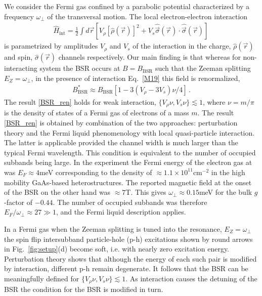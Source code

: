 We consider the Fermi gas confined by a parabolic potential characterized by a frequency $\omega_{\perp}$ of the transversal motion. 
The local electron-electron interaction 
\begin{align}\label{M19}
\hat{H}_{\mathrm{int}} = \frac{1}{2} \int d \vec{r} \left[ V_{\rho} \left[\hat{\rho}(\vec{r})\right]^2 + 
V_s \hat{\vec{\sigma}}(\vec{r}) \cdot  \hat{\vec{\sigma}}(\vec{r}) \right]\,
\end{align}
is parametrized by amplitudes $V_{\rho}$ and $V_s$ of the interaction in the charge, $\hat{\rho}(\vec{r})$ and spin, $\hat{\sigma}(\vec{r})$ channels respectively.
Our main finding is that whereas for non-interacting system the BSR occurs at $B=B_{\mathrm{BSR}}$ such that the Zeeman splitting $E_Z = \omega_{\perp}$, in the presence of interaction Eq.~\eqref{M19} this field is renormalized,
\begin{align}\label{BSR_ren}
B^*_{\mathrm{BSR}} \approx B_{\mathrm{BSR}} \left[ 1 - 3 (V_{\rho} - 3 V_s) \nu/4 \right]\, .
\end{align}
The result \eqref{BSR_ren} holds for weak interaction, $\{ V_{\rho}\nu,  V_{s}\nu \} \lesssim 1$, where $\nu = m/\pi$ is the density of states of a Fermi gas of electrons of a mass $m$.
%
The result \eqref{BSR_ren} is obtained by combination of the two approaches: perturbation theory and the Fermi liquid phenomenology with local quasi-particle interaction.
The latter is applicable provided the channel width is much larger than the 
typical Fermi wavelength.
This condition is equivalent to the number of occupied subbands being large.
In the experiment \cite{Frolov2009} the Fermi energy of the electron gas at was $E_F \approx 4$meV corresponding to the density of $\approx 1.1 \times 10^{11}$cm$^{-2}$ in the high mobility GaAs-based heterostructures.
The reported magnetic field at the onset of the BSR on the other hand was $\approx 7$T. 
This gives $\omega_{\perp} \approx 0.15$meV for the bulk $g$-factor of $-0.44$.
The number of occupied subbands was therefore $E_F/\omega_{\perp} \approx 27 \gg 1$, and the Fermi liquid description applies.
% 

In a Fermi gas when the Zeeman splitting is tuned into the resonance, $E_Z = \omega_{\perp}$ the spin flip intersubband  particle-hole (p-h) excitations shown by round arrows in Fig.~\ref{fig:setup}(d) become soft, i.e. with nearly zero excitation energy.
Perturbation theory shows that although the energy of each such pair is modified by interaction, different p-h remain degenerate. 
It follows that the BSR can be meaningfully defined for $\{ V_{\rho}\nu,  V_{s}\nu \} \lesssim 1$.
As interaction causes the detuning of the BSR the condition for the BSR is modified in turn.

